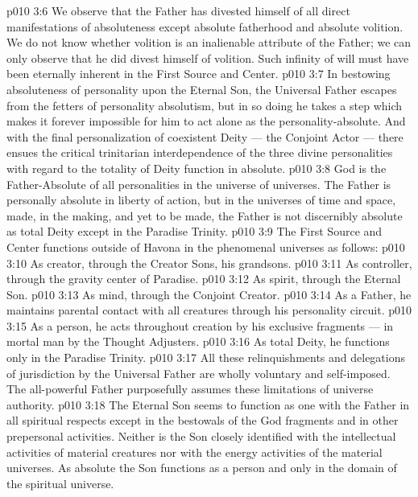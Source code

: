 \vs p010 3:6 We observe that the Father has divested himself of all direct manifestations of absoluteness except absolute fatherhood and absolute volition. We do not know whether volition is an inalienable attribute of the Father; we can only observe that he did  divest himself of volition. Such infinity of will must have been eternally inherent in the First Source and Center.
\vs p010 3:7 In bestowing absoluteness of personality upon the Eternal Son, the Universal Father escapes from the fetters of personality absolutism, but in so doing he takes a step which makes it forever impossible for him to act alone as the personality\hyp{}absolute. And with the final personalization of coexistent Deity --- the Conjoint Actor --- there ensues the critical trinitarian interdependence of the three divine personalities with regard to the totality of Deity function in absolute.
\vs p010 3:8 God is the Father\hyp{}Absolute of all personalities in the universe of universes. The Father is personally absolute in liberty of action, but in the universes of time and space, made, in the making, and yet to be made, the Father is not discernibly absolute as total Deity except in the Paradise Trinity.
\vs p010 3:9 \pc The First Source and Center functions outside of Havona in the phenomenal universes as follows:
\vs p010 3:10 \bibnobreakspace As creator, through the Creator Sons, his grandsons.
\vs p010 3:11 \bibnobreakspace As controller, through the gravity center of Paradise.
\vs p010 3:12 \bibnobreakspace As spirit, through the Eternal Son.
\vs p010 3:13 \bibnobreakspace As mind, through the Conjoint Creator.
\vs p010 3:14 \bibnobreakspace As a Father, he maintains parental contact with all creatures through his personality circuit.
\vs p010 3:15 \bibnobreakspace As a person, he acts  throughout creation by his exclusive fragments --- in mortal man by the Thought Adjusters.
\vs p010 3:16 \bibnobreakspace As total Deity, he functions only in the Paradise Trinity.
\vs p010 3:17 \pc All these relinquishments and delegations of jurisdiction by the Universal Father are wholly voluntary and self\hyp{}imposed. The all\hyp{}powerful Father purposefully assumes these limitations of universe authority.
\vs p010 3:18 \pc The Eternal Son seems to function as one with the Father in all spiritual respects except in the bestowals of the God fragments and in other prepersonal activities. Neither is the Son closely identified with the intellectual activities of material creatures nor with the energy activities of the material universes. As absolute the Son functions as a person and only in the domain of the spiritual universe.
